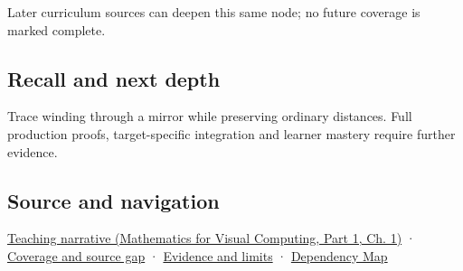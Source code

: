 \hypertarget{appendix-87d7626c8d37-used-by}{}

Later curriculum sources can deepen this same node; no future coverage is marked complete.

\subsection{Recall and next depth}\label{appendix-87d7626c8d37-recall-and-next-depth}

\hypertarget{appendix-87d7626c8d37-recall-and-next-depth}{}

Trace winding through a mirror while preserving ordinary distances. Full production proofs, target-specific integration and learner mastery require further evidence.

\subsection{Source and navigation}\label{appendix-87d7626c8d37-source-and-navigation}

\hypertarget{appendix-87d7626c8d37-source-and-navigation}{}

\href{../02-Mathematics-for-Visual-Computing-P01/main.pdf\#01-foundations-i-ch017-oriented-area-tells-us-which-side-of-the-panel-is-front}{Teaching narrative (Mathematics for Visual Computing, Part 1, Ch. 1)} · \hyperref[appendix-fd090d982a15-phase-6---parts-501-600]{Coverage and source gap} · \hyperref[appendix-a103e7846d21-phase-6---source-analysis-and-verification]{Evidence and limits} · \hyperref[appendix-4ad47bdd269a]{Dependency Map}
